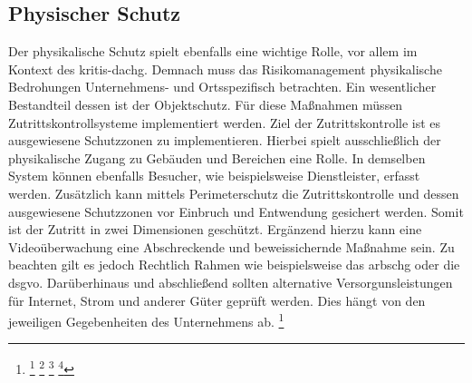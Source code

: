 \documentclass[11pt,a4paper,hidelinks]{article}   %
\begin{document}
        \subsection{Physischer Schutz}
        Der physikalische Schutz spielt ebenfalls eine wichtige Rolle, vor allem im Kontext des \gls{kritis-dachg}. Demnach muss das Risikomanagement physikalische Bedrohungen Unternehmens- und Ortsspezifisch betrachten. Ein wesentlicher Bestandteil dessen ist der Objektschutz. Für diese Maßnahmen müssen Zutrittskontrollsysteme implementiert werden. Ziel der Zutrittskontrolle ist es ausgewiesene Schutzzonen zu implementieren. Hierbei spielt ausschließlich der physikalische Zugang zu Gebäuden und Bereichen eine Rolle. In demselben System können ebenfalls Besucher, wie beispielsweise Dienstleister, erfasst werden. Zusätzlich kann mittels Perimeterschutz die Zutrittskontrolle und dessen ausgewiesene Schutzzonen vor Einbruch und Entwendung gesichert werden. Somit ist der Zutritt in zwei Dimensionen geschützt. Ergänzend hierzu kann eine Videoüberwachung eine Abschreckende und beweissichernde Maßnahme sein. Zu beachten gilt es jedoch Rechtlich Rahmen wie beispielsweise das \gls{arbschg} oder die \gls{dsgvo}. Darüberhinaus und abschließend sollten alternative Versorgunsleistungen für Internet, Strom und anderer Güter geprüft werden. Dies hängt von den jeweiligen Gegebenheiten des Unternehmens ab.
        \footnote{
            \footcite[Vgl.][, S. 255 - 257, 260 - 261 \& 401 - 410]{9780128044629}
            \footcite[Vgl.][, S. 183, 199 - 208]{9780123878465}
            \footcite[Vgl.][, §3 - §5]{ArbSchG}
            \footcite[Vgl.][, Artikel 5]{EU2016-679}
        }
    \newpage
\end{document}
